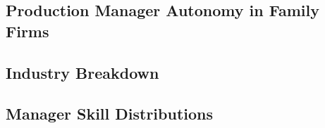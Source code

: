 \documentclass[11pt,a4paper]{article}
\begin{document}
\subsection{Production Manager Autonomy in Family Firms}



\subsection{Industry Breakdown}






\subsection{Manager Skill Distributions}
\end{document}

